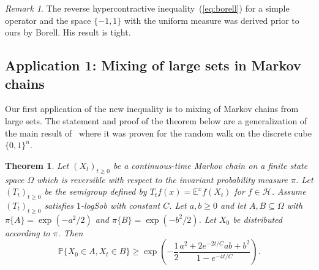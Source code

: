 \documentclass[11pt]{amsart}
\newcommand{\E}{\mathbb{E}}
\newcommand{\PP}{\mathbb{P}}
\newcommand{\1}{\mathbf{1}}
\def\E{{\mathbb E}}
\theoremstyle{definition}
\theoremstyle{plain}
\newtheorem{theorem}[example]{Theorem}
\theoremstyle{remark}
\newtheorem{remark}[example]{Remark}
\numberwithin{equation}{section}
\begin{document}
\begin{remark}
The reverse hypercontractive inequality~(\ref{eq:borell}) for a simple
operator and the space $\{-1,1\}$ with the uniform measure was derived prior to ours by Borell.
His result is tight.
\end{remark}

\subsection{Application 1: Mixing of large sets in Markov chains}

Our first application of the new inequality is to mixing of Markov chains from  large sets.
The statement and proof of the theorem below are a generalization of the main result of~\cite{Mossel06} where it was proven for the random walk on the discrete cube $\{0,1\}^n$.

\begin{theorem} \label{t:intersection}
Let $(X_t)_{ t \ge 0}$ be a continuous-time
Markov chain on a finite state space $\Omega$ which is reversible with respect to the invariant probability measure $\pi$.
Let $(T_{t})_{t \geq 0}$ be the semigroup defined by $T_t f (x)= \E^x f(X_t)$ for $f \in \mathcal H$.
Assume $(T_{t})_{t \geq 0}$ satisfies $1$-logSob with constant $C$. Let $a,b \geq 0$ and
let $A, B \subseteq \Omega$ with $\pi\{A\} = \exp(-a^2/2)$ and $\pi\{B\}  = \exp(-b^2/2)$.  Let $X_0$ be distributed according to $\pi$. Then
\begin{equation}\label{ieq:twosetAB}
\PP\{ X_0 \in A, X_t \in B \} \ge \exp \left( - \frac{1}{2} \frac{a^2 + 2 e^{-2t/C}ab + b^2 }{1- e^{-4t/C}} \right).
\end{equation}
\end{theorem}
\end{document}
